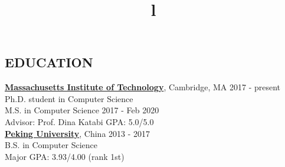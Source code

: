 \documentclass[margin]{res}
\newcommand{\Bullet}[1]{{\raisebox{0.25ex}{\tiny$\bullet$\ }}{#1}\\}
\begin{document}


\address{ \href{mailto:haohe@mit.edu}{haohe@mit.edu} $\mid$ {+1\ 617-840-0491} }


\begin{resume}

\section{EDUCATION}
\href{http://web.mit.edu}{\textbf{Massachusetts Institute of Technology}}, Cambridge, MA
\hfill 2017 - present
\\
Ph.D. student in Computer Science\\
M.S. in Computer Science \hfill {2017 - Feb 2020}
\\
\Bullet{Advisor: Prof. Dina Katabi    \qquad GPA: 5.0/5.0}
\href{http://english.pku.edu.cn/}{\textbf{Peking University}}, China
\hfill 2013 - 2017
\\
B.S. in Computer Science
\\
\Bullet{Major GPA: 3.93/4.00 (rank 1st)}
\vspace{-15mm}

\begin{format}
\title{l} \hfill {}\\
\body\\
\end{format}


\end{resume}
\end{document}

